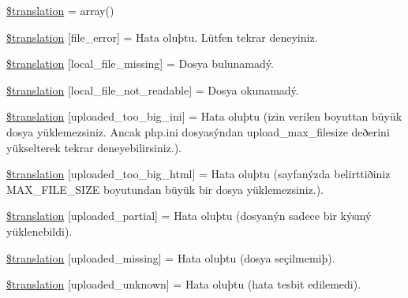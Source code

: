 \begin{DoxyCompactItemize}
\item 
\hyperlink{class_8upload_8tr___t_r_8php_a1f198d410fecc3871ebdd468d343a5e3}{\$translation} = array()
\item 
\hyperlink{class_8upload_8tr___t_r_8php_ac7498e49b9771b04698029aa61c70821}{\$translation} \mbox{[}\textquotesingle{}file\+\_\+error\textquotesingle{}\mbox{]} = \textquotesingle{}Hata oluþtu. Lütfen tekrar deneyiniz.\textquotesingle{}
\item 
\hyperlink{class_8upload_8tr___t_r_8php_a6ec3d3a47ab70d77e7aa593e82ead10e}{\$translation} \mbox{[}\textquotesingle{}local\+\_\+file\+\_\+missing\textquotesingle{}\mbox{]} = \textquotesingle{}Dosya bulunamadý.\textquotesingle{}
\item 
\hyperlink{class_8upload_8tr___t_r_8php_a60104befef9b241f3a7a6a755618a4b3}{\$translation} \mbox{[}\textquotesingle{}local\+\_\+file\+\_\+not\+\_\+readable\textquotesingle{}\mbox{]} = \textquotesingle{}Dosya okunamadý.\textquotesingle{}
\item 
\hyperlink{class_8upload_8tr___t_r_8php_a6a08dcd0d3651fdd098568f6b2f0a42c}{\$translation} \mbox{[}\textquotesingle{}uploaded\+\_\+too\+\_\+big\+\_\+ini\textquotesingle{}\mbox{]} = \textquotesingle{}Hata oluþtu (izin verilen boyuttan büyük dosya yüklemezsiniz. Ancak php.\+ini dosyasýndan upload\+\_\+max\+\_\+filesize deðerini yükselterek tekrar deneyebilirsiniz.).\textquotesingle{}
\item 
\hyperlink{class_8upload_8tr___t_r_8php_a623d5b8b92169f57d7e43458aa911cbb}{\$translation} \mbox{[}\textquotesingle{}uploaded\+\_\+too\+\_\+big\+\_\+html\textquotesingle{}\mbox{]} = \textquotesingle{}Hata oluþtu (sayfanýzda belirttiðiniz M\+A\+X\+\_\+\+F\+I\+L\+E\+\_\+\+S\+I\+Z\+E boyutundan büyük bir dosya yüklemezsiniz.).\textquotesingle{}
\item 
\hyperlink{class_8upload_8tr___t_r_8php_a967c17da21b0a2d3bd65cca3a9ca0ea8}{\$translation} \mbox{[}\textquotesingle{}uploaded\+\_\+partial\textquotesingle{}\mbox{]} = \textquotesingle{}Hata oluþtu (dosyanýn sadece bir kýsmý yüklenebildi).\textquotesingle{}
\item 
\hyperlink{class_8upload_8tr___t_r_8php_a0cce433260be65f1f35853a6b4b8952b}{\$translation} \mbox{[}\textquotesingle{}uploaded\+\_\+missing\textquotesingle{}\mbox{]} = \textquotesingle{}Hata oluþtu (dosya seçilmemiþ).\textquotesingle{}
\item 
\hyperlink{class_8upload_8tr___t_r_8php_a4a9168e922b827e6a28b5db1c00774ca}{\$translation} \mbox{[}\textquotesingle{}uploaded\+\_\+unknown\textquotesingle{}\mbox{]} = \textquotesingle{}Hata oluþtu (hata tesbit edilemedi).\textquotesingle{}

\end{DoxyCompactItemize}
